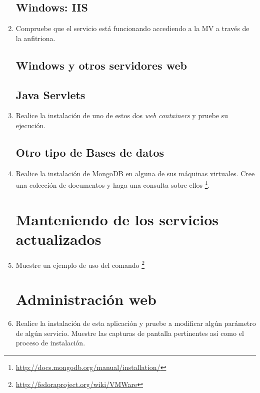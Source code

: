 \documentclass[paper=a4, fontsize=11pt]{scrartcl} %
\numberwithin{equation}{section} %
\numberwithin{figure}{section} %
\numberwithin{table}{section} %
\begin{document}
\begin{enumerate}
	
	\subsection{Windows: IIS}
	\item Compruebe que el servicio está funcionando accediendo a la MV a través de la anfitriona.
	
	\subsection{Windows y otros servidores web}
	\subsection{Java Servlets}
	\item Realice la instalación de uno de estos dos \textit{web containers} y pruebe su ejecución.
	
	
	\subsection{Otro tipo de Bases de datos}
	\item Realice la instalación de MongoDB en alguna de sus máquinas virtuales. Cree una colección de
	documentos y haga una consulta sobre ellos \footnote{\url{http://docs.mongodb.org/manual/installation/}}.
	
	
	\section{Manteniendo de los servicios actualizados}
	\item Muestre un ejemplo de uso del comando \footnote{\url{http://fedoraproject.org/wiki/VMWare}}
	
	\section{Administración web}
	\item Realice la instalación de esta aplicación y pruebe a modificar algún parámetro de algún
	servicio. Muestre las capturas de pantalla pertinentes así como el proceso de instalación.
	

\end{enumerate}
\end{document}
